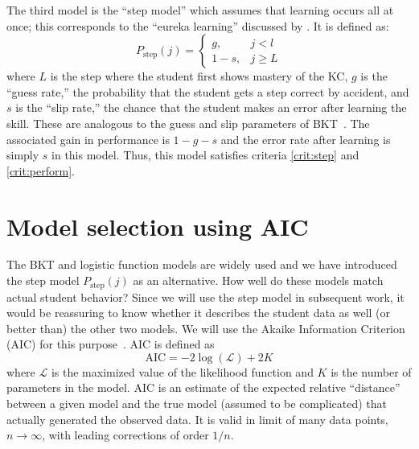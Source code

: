 \documentclass{edm_template}
\begin{document}
The third model is the ``step model'' which assumes that learning 
occurs all at once; this corresponds to the ``eureka learning''
discussed by \cite{baker_detecting_2011}.  It is defined as:
%
\begin{equation}
    P_\mathrm{step}(j)= \left\{\begin{array}{cc}
                 g, & j<l \\
                 1-s, & j\ge L 
                 \end{array} \right. 
\end{equation}
%
where $L$ is the step where the student first shows mastery of the KC,
$g$ is the ``guess rate,'' the probability that the student gets a
step correct by accident, and $s$ is the ``slip rate,'' the chance
that the student makes an error after learning the skill.  These are
analogous to the guess and slip parameters of
BKT~\cite{corbett_knowledge_1995}.  The associated gain in performance
is $1-g-s$ and the error rate after learning is simply $s$ in this
model.  Thus, this model satisfies criteria \ref{crit:step} and
\ref{crit:perform}.

\section{Model selection using AIC}
\label{model-selection}

The BKT and logistic function models are widely used and
we have introduced the step model $P_\mathrm{step}(j)$
as an alternative.  How
well do these models match actual student behavior?
Since we will use the step model in subsequent
work, it would be reassuring to know whether it describes the student data as 
well (or better than) the other two models.  We will use the Akaike Information Criterion (AIC) for this purpose~\cite{akaike_new_1974,burnham_model_2002}.
AIC is defined as
%
\begin{equation}
   \mathrm{AIC}= -2 \log\left(\mathcal{L}\right) + 2K
\end{equation}
% 
where $\mathcal{L}$ is the maximized value of the likelihood function
and $K$ is the number of parameters in the model.
 AIC is an estimate of the expected relative ``distance''
between a given model and the true model (assumed to be complicated) 
that actually generated the observed data.  It is valid in limit of 
many data points, $n\to\infty$, with leading corrections of order $1/n$.
\end{document}

